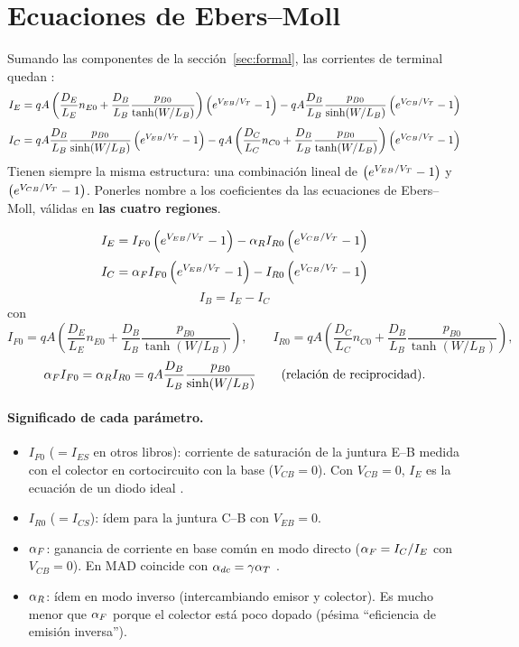 \section{Ecuaciones de Ebers--Moll}
\label{sec:ebers-moll}

Sumando las componentes de la sección~\ref{sec:formal}, las corrientes de terminal quedan
:
\[
  I_E = qA\left(\frac{D_E}{L_E}n_{E0}+\frac{D_B}{L_B}\frac{p_{B0}}{\tanh(W/L_B)}\right)\left(e^{V_{EB}/V_T}-1\right)
      - qA\frac{D_B}{L_B}\frac{p_{B0}}{\sinh(W/L_B)}\left(e^{V_{CB}/V_T}-1\right)
\]
\[
  I_C = qA\frac{D_B}{L_B}\frac{p_{B0}}{\sinh(W/L_B)}\left(e^{V_{EB}/V_T}-1\right)
      - qA\left(\frac{D_C}{L_C}n_{C0}+\frac{D_B}{L_B}\frac{p_{B0}}{\tanh(W/L_B)}\right)\left(e^{V_{CB}/V_T}-1\right)
\]
Tienen siempre la misma estructura: una combinación lineal de $\left(e^{V_{EB}/V_T}-1\right)$ y $\left(e^{V_{CB}/V_T}-1\right)$. Ponerles nombre
a los coeficientes da las ecuaciones de Ebers--Moll, válidas en \textbf{las cuatro regiones}.

\begin{clave}
\[
  I_E = I_{F0}\left(e^{V_{EB}/V_T}-1\right) - \alpha_R I_{R0}\left(e^{V_{CB}/V_T}-1\right)
\]
\[
  I_C = \alpha_F I_{F0}\left(e^{V_{EB}/V_T}-1\right) - I_{R0}\left(e^{V_{CB}/V_T}-1\right)
\]
\[
  I_B = I_E - I_C
\]
con
\[
  I_{F0} = qA\left(\frac{D_E}{L_E}n_{E0}+\frac{D_B}{L_B}\frac{p_{B0}}{\tanh(W/L_B)}\right),
  \qquad
  I_{R0} = qA\left(\frac{D_C}{L_C}n_{C0}+\frac{D_B}{L_B}\frac{p_{B0}}{\tanh(W/L_B)}\right),
\]
\[
  \alpha_F I_{F0} = \alpha_R I_{R0} = qA\frac{D_B}{L_B}\frac{p_{B0}}{\sinh(W/L_B)}
  \qquad\text{(relación de reciprocidad)}.
\]
\end{clave}

\paragraph{Significado de cada parámetro.}
\begin{itemize}
  \item $I_{F0}$ ($=I_{ES}$ en otros libros): corriente de saturación de la juntura E--B
  medida con el colector en cortocircuito con la base ($V_{CB}=0$). Con $V_{CB}=0$, $I_E$ es la
  ecuación de un diodo ideal .
  \item $I_{R0}$ ($=I_{CS}$): ídem para la juntura C--B con $V_{EB}=0$.
  \item $\alpha_F$: ganancia de corriente en base común en modo directo ($\alpha_F=I_C/I_E$ con
  $V_{CB}=0$). En MAD coincide con $\alpha_{dc}=\gamma\alpha_T$ .
  \item $\alpha_R$: ídem en modo inverso (intercambiando emisor y colector). Es mucho menor
  que $\alpha_F$ porque el colector está poco dopado (pésima ``eficiencia de emisión inversa'').
\end{itemize}

